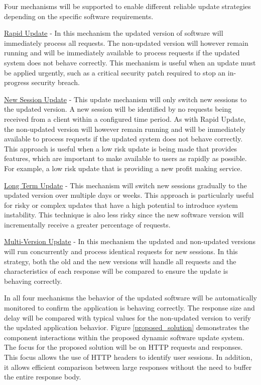 \documentclass[a4paper,11pt,twoside]{article}
\begin{document}
Four mechanisms will be supported to enable different reliable update strategies depending on the specific software requirements.

\underline{Rapid Update} -  In this mechanism the updated version of software will immediately process all requests. The non-updated version will however remain running and will be immediately available to process requests if the updated system does not behave correctly. This mechanism is useful when an update must be applied urgently, such as a critical security patch required to stop an in-progress security breach.

\underline{New Session Update} - This update mechanism will only switch new sessions to the updated version. A new session will be identified by no requests being received from a client within a configured time period. As with Rapid Update, the non-updated version will however remain running and will be immediately available to process requests if the updated system does not behave correctly. This approach is useful when a low risk update is being made that provides features, which are important to make available to users as rapidly as possible. For example, a low risk update that is providing a new profit making service.

\underline{Long Term Update} - This mechanism will switch new sessions gradually to the updated version over multiple days or weeks. This approach is particularly useful for risky or complex updates that have a high potential to introduce system instability. This technique is also less risky since the new software version will incrementally receive a greater percentage of requests.

\underline{Multi-Version Update} - In this mechanism the updated and non-updated versions will run concurrently and  process identical requests for new sessions.  In this strategy, both the old and the new versions will handle all requests and the characteristics of each response will be compared to ensure the update is behaving correctly.

In all four mechanisms the behavior of the updated software will be automatically monitored to confirm the application is behaving correctly. The response size and delay will be compared with typical values for the non-updated version to verify the updated application behavior. Figure \ref{proposed_solution} demonstrates the component interactions within the proposed dynamic software update system.  The focus for the proposed solution will be on HTTP requests and responses.  This focus allows the use of HTTP headers to identify user sessions.  In addition, it allows efficient comparison between large responses without the need to buffer the entire response body.\\\\
\end{document}
